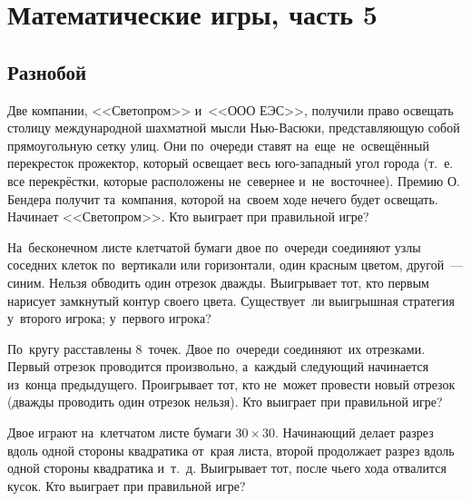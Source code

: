 

\section*{Математические игры, часть 5}



\subsection*{Разнобой}

\begin{problems}


\item
Две компании, <<Светопром>> и~<<ООО ЕЭС>>, получили право освещать столицу
международной шахматной мысли Нью-Васюки, представляющую собой прямоугольную
сетку улиц.
Они по~очереди ставят на~еще~не~освещённый перекресток прожектор, который
освещает весь юго-западный угол города
(т.~е. все перекрёстки, которые расположены не~севернее и~не~восточнее).
Премию О.\,Бендера получит та~компания, которой на~своем ходе нечего будет
освещать.
Начинает <<Светопром>>.
Кто выиграет при правильной игре?

\item
На~бесконечном листе клетчатой бумаги двое по~очереди соединяют узлы соседних
клеток по~вертикали или горизонтали, один красным цветом, другой~--- синим.
Нельзя обводить один отрезок дважды.
Выигрывает тот, кто первым нарисует замкнутый контур своего цвета.
Существует~ли выигрышная стратегия
\quad
\sbp у~второго игрока;
\quad
\sbp у~первого игрока?

\item
По~кругу расставлены 8~точек.
Двое по~очереди соединяют~их отрезками.
Первый отрезок проводится произвольно, а~каждый следующий начинается из~конца
предыдущего.
Проигрывает тот, кто не~может провести новый отрезок
(дважды проводить один отрезок нельзя).
Кто выиграет при правильной игре?

\item
Двое играют на~клетчатом листе бумаги $30 \times 30$.
Начинающий делает разрез вдоль одной стороны квадратика от~края листа,
второй продолжает разрез вдоль одной стороны квадратика и~т.~д.
Выигрывает тот, после чьего хода отвалится кусок.
Кто выиграет при правильной игре?


\end{problems}
